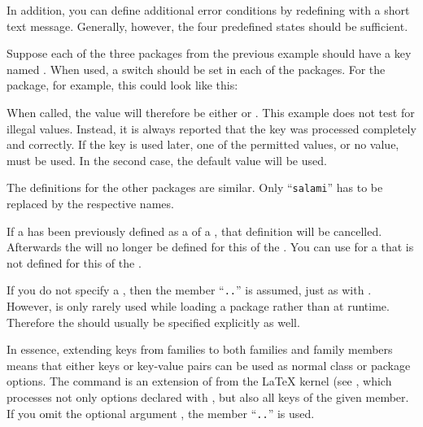 In addition, you can define additional error conditions by redefining
 with a short text message. Generally, however, the four
predefined states should be sufficient.

\begin{Example}
  Suppose each of the three packages from the previous example should have a
  key named . When used, a switch should be set in each of
  the packages. For the  package, for example, this could look
  like this:
  When called, the value will therefore be either  or
  . This example does not test for illegal values. Instead,
  it is always reported that the key was processed completely and correctly.
  If the key is used later, one of the permitted values, or no value, must be
  used. In the second case, the default  value will be used.

  The definitions for the other packages are similar. Only ``\texttt{salami}''
  has to be replaced by the respective names.
\end{Example}
%
\EndIndexGroup


\begin{Declaration}
\end{Declaration}
If a  has been previously
defined as a  of a , that definition will be
cancelled. Afterwards the  will no longer be defined for this
 of the . You can use  for a
 that is not defined for this  of the .

If you do not specify a , then the member
``\texttt{.}\texttt{.}'' is assumed, just as
with . However, 
is only rarely used while loading a package rather than at runtime. Therefore
the  should usually be specified explicitly as well.%
\EndIndexGroup


\begin{Declaration}
\end{Declaration}
In essence, extending keys from families to both families and family members
means that either keys or key-value pairs can be used as normal class or
package options. The  command is an extension of
 from the \LaTeX{} kernel (see \cite{latex:clsguide},
which processes not only options declared with , but also
all keys of the given member. If you omit the optional argument
, the member
``\texttt{.}\texttt{.}'' is used.

